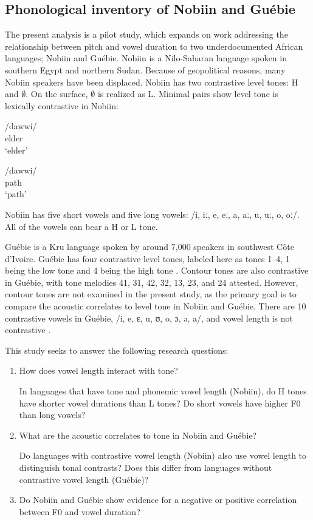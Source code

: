\documentclass[output=paper]{langscibook}
\begin{document}
\subsection{Phonological inventory of Nobiin and Guébie}
The present analysis is a pilot study, which expands on work addressing the relationship between pitch and vowel duration to two underdocumented African languages; Nobiin and Guébie. Nobiin is a Nilo-Saharan language spoken in southern Egypt and northern Sudan. Because of geopolitical reasons, many Nobiin speakers have been displaced. Nobiin has two contrastive level tones: H and $\emptyset$. On the surface, $\emptyset$ is realized as L. Minimal pairs show level tone is lexically contrastive in Nobiin: 


\ea \label{ex:oakley:NobiinContrastiveTone}
\begin{xlist}

\ex \label{ex:oakley:NobiinElder}
\gll /daww\'i/ \\
elder \\
\glt `elder' 

\ex \label{ex:oakley:NobiinPath}
\gll /dawwi/ \\
path \\
\glt `path' 

\end{xlist}

\z 



Nobiin has five short vowels and five long vowels: /i, {iː}, e, {eː}, a, {aː}, u, {uː}, o, {oː}/. All of the vowels can bear a H or L tone.

Guébie is a Kru language spoken by around 7,000 speakers in southwest C\^ote d'Ivoire. Guébie has four contrastive level tones, labeled here as tones 1--4, 1 being the low tone and 4 being the high tone \citep{sande2017}. Contour tones are also contrastive in Guébie, with tone melodies 41, 31, 42, 32, 13, 23, and 24 attested. However, contour tones are not examined in the present study, as the primary goal is to compare the acoustic correlates to level tone in Nobiin and Guébie. There are 10 contrastive vowels in Guébie, /i, e, ɛ, u, ʊ, o, ɔ, ə, a/, and vowel length is not contrastive \citep{sande2017}.


This study seeks to answer the following research questions:
\begin{enumerate}
\item How does vowel length interact with tone? 

In languages that have tone and phonemic vowel length (Nobiin), do H tones have shorter vowel durations than L tones? Do short vowels have higher F0 than long vowels?

\item What are the acoustic correlates to tone in Nobiin and Guébie?

Do languages with contrastive vowel length (Nobiin) also use vowel length to distinguish tonal contrasts? Does this differ from languages without contrastive vowel length (Guébie)?

\item Do Nobiin and Guébie show evidence for a negative or positive correlation between F0 and vowel duration?
\end{enumerate}
\end{document}
